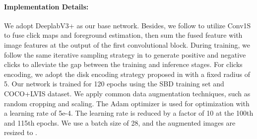 \documentclass{bmvc2k}
\begin{document}
\paragraph{\textbf{Implementation Details:}} We adopt DeeplabV3+\cite{Chen_2018_ECCV} as our base network.
Besides, we follow \cite{sofiiuk2021reviving} to utilize Conv1S
to fuse click maps and foreground estimation, then sum the fused feature with image features at the output of the first convolutional block.
During training, we follow the same iterative sampling strategy in \cite{sofiiuk2021reviving} to 
generate positive and negative clicks to alleviate the gap between the training and inference stages.
For clicks encoding, we adopt the disk encoding strategy proposed in \cite{benenson2019large} with a fixed radius of 5.
Our network is trained for 120 epochs using the SBD training set and COCO+LVIS dataset. We apply common data augmentation techniques, such as random cropping and scaling. The Adam optimizer is used for optimization with a learning rate of 5e-4. The learning rate is reduced by a factor of 10 at the 100th and 115th epochs. We use a batch size of 28, and the augmented images are resized to .



    
\end{document}
